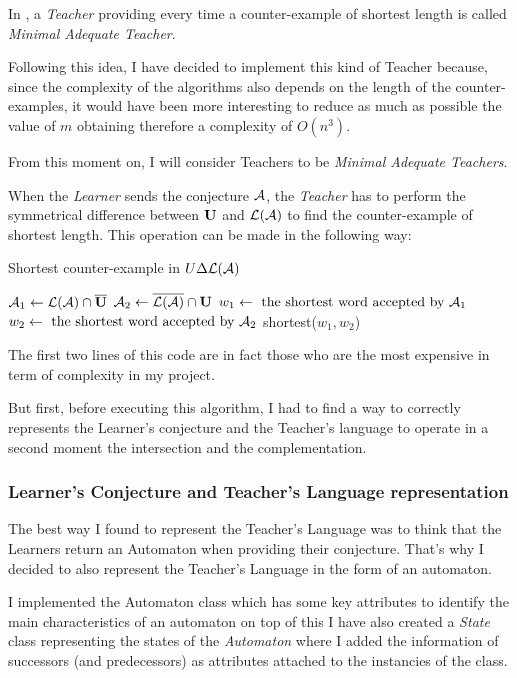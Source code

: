 \begin{definition}
  In \cite{LPaper}, a \textit{Teacher} providing every time a counter-example of shortest length is called \textit{Minimal Adequate Teacher}.
\end{definition}

Following this idea, I have decided to implement this kind of Teacher because, since the complexity of the algorithms also depends on the length of the counter-examples, it would have been more interesting to reduce as much as possible the value of $m$ obtaining therefore a complexity of $O(n^3)$.

From this moment on, I will consider Teachers to be \textit{Minimal Adequate Teachers}.

When the \textit{Learner} sends the conjecture $\mathcal{A}$, the \textit{Teacher} has to perform the symmetrical difference between $\mathbf{U}$ and $\mathcal{L}(\mathcal{A})$ to find the counter-example of shortest length. This operation can be made in the following way:

\begin{algorithm}
  \caption{Shortest counter-example in $U \Delta \mathcal{L}(\mathcal{A})$}
  $\mathcal{A}_1 \gets \mathcal{L}(\mathcal{A}) \cap \overline{\mathbf{U}}$\;
  $\mathcal{A}_2 \gets \overline{\mathcal{L}(\mathcal{A})} \cap \mathbf{U}$\;
  $w_1 \gets \text{ the shortest word accepted by } \mathcal{A}_1$\;
  $w_2 \gets \text{ the shortest word accepted by } \mathcal{A}_2$\;
  \Return shortest($w_1, w_2$)\;
\end{algorithm}

The first two lines of this code are in fact those who are the most expensive in term of complexity in my project.

But first, before executing this algorithm, I had to find a way to correctly represents the Learner's conjecture and the Teacher's language to operate in a second moment the intersection and the complementation.

\subsubsection{Learner's Conjecture and Teacher's Language representation}

The best way I found to represent the Teacher's Language was to think that the Learners return an Automaton when providing their conjecture. That's why I decided to also represent the Teacher's Language in the form of an automaton.

I implemented the Automaton class which has some key attributes to identify the main characteristics of an automaton on top of this I have also created a \textit{State} class representing the states of the \textit{Automaton} where I added the information of successors (and predecessors) as attributes attached to the instancies of the class.

